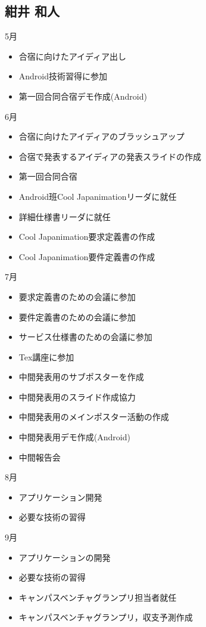 \subsection{紺井 和人}
5月
\begin{itemize}
\item 合宿に向けたアイディア出し
\item Android技術習得に参加
\item 第一回合同合宿デモ作成(Android)
\end{itemize}
6月
\begin{itemize}
\item 合宿に向けたアイディアのブラッシュアップ
\item 合宿で発表するアイディアの発表スライドの作成
\item 第一回合同合宿
\item Android班Cool Japanimationリーダに就任
\item 詳細仕様書リーダに就任
\item Cool Japanimation要求定義書の作成
\item Cool Japanimation要件定義書の作成
\end{itemize}
7月
\begin{itemize}
\item 要求定義書のための会議に参加
\item 要件定義書のための会議に参加
\item サービス仕様書のための会議に参加
\item Tex講座に参加
\item 中間発表用のサブポスターを作成
\item 中間発表用のスライド作成協力
\item 中間発表用のメインポスター活動の作成
\item 中間発表用デモ作成(Android)
\item 中間報告会
\end{itemize}
8月
\begin{itemize}
\item アプリケーション開発
\item 必要な技術の習得
\end{itemize}
9月
\begin{itemize}
\item アプリケーションの開発
\item 必要な技術の習得
\item キャンパスベンチャグランプリ担当者就任
\item キャンパスベンチャグランプリ，収支予測作成
\end{itemize}
